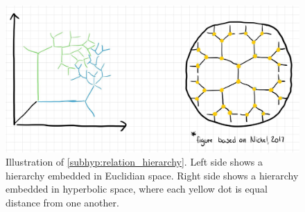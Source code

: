 \begin{figure}[htb]
\centering
\begin{minipage}{0.95\columnwidth}
\centering
\small
\includegraphics[scale=0.12]{content/hypotheses/figures/relation_properties_E.jpg}
\caption{Illustration of \autoref{subhyp:relation_hierarchy}. Left side shows a hierarchy embedded in Euclidian space. Right side shows a hierarchy embedded in hyperbolic space, where each yellow dot is equal distance from one another.
}
\label{fig:relation_properties_hierarchy}
\end{minipage}
\end{figure}